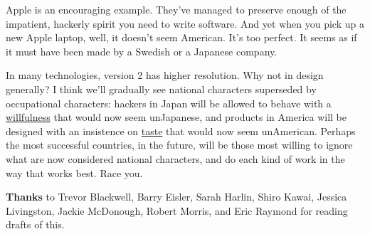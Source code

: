 Apple is an encouraging example. They've managed to preserve enough of
the impatient, hackerly spirit you need to write software. And yet when
you pick up a new Apple laptop, well, it doesn't seem American. It's too
perfect. It seems as if it must have been made by a Swedish or a
Japanese company.

In many technologies, version 2 has higher resolution. Why not in design
generally? I think we'll gradually see national characters superseded by
occupational characters: hackers in Japan will be allowed to behave with
a \href{gba.html}{willfulness} that would now seem unJapanese, and
products in America will be designed with an insistence on
\href{taste.html}{taste} that would now seem unAmerican. Perhaps the
most successful countries, in the future, will be those most willing to
ignore what are now considered national characters, and do each kind of
work in the way that works best. Race you.


\textbf{Thanks} to Trevor Blackwell, Barry Eisler, Sarah Harlin, Shiro
Kawai, Jessica Livingston, Jackie McDonough, Robert Morris, and Eric
Raymond for reading drafts of this.